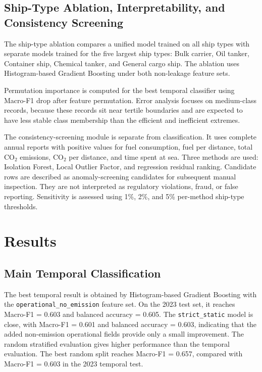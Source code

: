 \documentclass[jmse,article,submit,pdftex,oneauthor]{Definitions/mdpi}
\begin{document}
\subsection{Ship-Type Ablation, Interpretability, and Consistency Screening}

The ship-type ablation compares a unified model trained on all ship types with separate models trained for the five largest ship types: Bulk carrier, Oil tanker, Container ship, Chemical tanker, and General cargo ship. The ablation uses Histogram-based Gradient Boosting under both non-leakage feature sets.

Permutation importance is computed for the best temporal classifier using Macro-F1 drop after feature permutation. Error analysis focuses on medium-class records, because these records sit near tertile boundaries and are expected to have less stable class membership than the efficient and inefficient extremes.

The consistency-screening module is separate from classification. It uses complete annual reports with positive values for fuel consumption, fuel per distance, total CO$_2$ emissions, CO$_2$ per distance, and time spent at sea. Three methods are used: Isolation Forest, Local Outlier Factor, and regression residual ranking. Candidate rows are described as anomaly-screening candidates for subsequent manual inspection. They are not interpreted as regulatory violations, fraud, or false reporting. Sensitivity is assessed using 1\%, 2\%, and 5\% per-method ship-type thresholds.

\section{Results}

\subsection{Main Temporal Classification}

The best temporal result is obtained by Histogram-based Gradient Boosting with the \texttt{operational\_no\_emission} feature set. On the 2023 test set, it reaches Macro-F1 = 0.603 and balanced accuracy = 0.605. The \texttt{strict\_static} model is close, with Macro-F1 = 0.601 and balanced accuracy = 0.603, indicating that the added non-emission operational fields provide only a small improvement. The random stratified evaluation gives higher performance than the temporal evaluation. The best random split reaches Macro-F1 = 0.657, compared with Macro-F1 = 0.603 in the 2023 temporal test.
\end{document}

